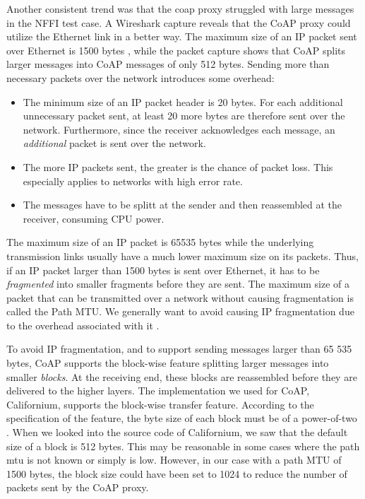 Another consistent trend was that the \gls{coap} proxy struggled with large messages
in the NFFI test case. A Wireshark capture reveals that the CoAP proxy could
utilize the Ethernet link in a better way. The maximum size of an IP packet sent
over Ethernet is 1500 bytes \cite{rfc-894}, while the packet capture shows that
CoAP splits larger messages into CoAP messages of only 512 bytes. Sending more
than necessary packets over the network introduces some overhead:

\begin{itemize}

    \item The minimum size of an IP packet header is 20 bytes. For each
    additional unnecessary packet sent, at least 20 more bytes are therefore
    sent over the network. Furthermore, since the receiver acknowledges each
    message, an \textit{additional} packet is sent over the network.

    \item The more IP packets sent, the greater is the chance of packet loss.
    This especially applies to networks with high error rate.

    \item The messages have to be splitt at the sender and then reassembled at
    the receiver, consuming CPU power.

\end{itemize}

The maximum size of an IP packet is 65535 bytes \cite{rfc-791} while the
underlying transmission links usually have a much lower maximum size on its
packets. Thus, if an IP packet larger than 1500 bytes is sent over Ethernet, it
has to be \textit{fragmented} into smaller fragments before they are sent. The
maximum size of a packet that can be transmitted over a network without causing
fragmentation is called the Path MTU. We generally want to avoid causing IP
fragmentation due to the overhead associated with it \cite{genkov2006avoiding}.

To avoid IP fragmentation, and to support sending messages larger than 65 535
bytes, CoAP supports the block-wise feature splitting larger messages into
smaller \textit{blocks}. At the receiving end, these blocks are reassembled
before they are delivered to the higher layers. The implementation we used for
CoAP, Californium, supports the block-wise transfer feature. According to the
specification of the feature, the byte size of each block must be of a
power-of-two \cite{draft-coap-blockwise}. When we looked into the source code of
Californium, we saw that the default size of a block is 512 bytes. This may be
reasonable in some cases where the path \gls{mtu} is not known or simply is low.
However, in our case with a path MTU of 1500 bytes, the block size could have
been set to 1024 to reduce the number of packets sent by the CoAP proxy.

